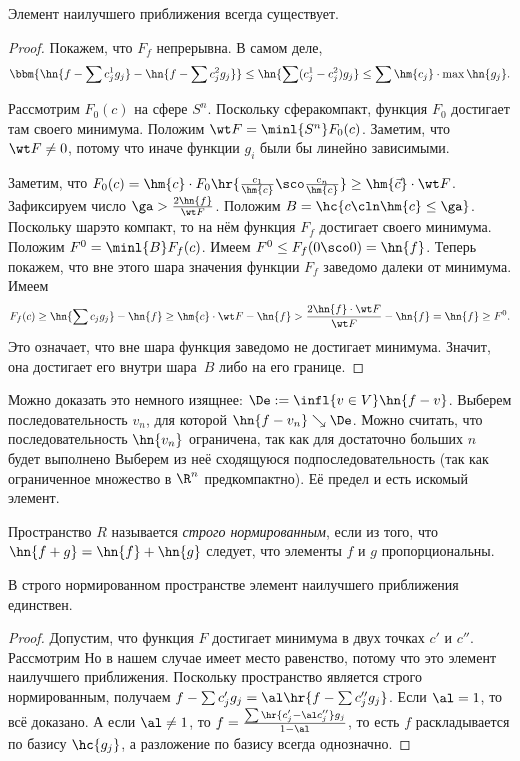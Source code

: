 \documentclass[a4paper]{article}
\begin{document}
\begin{theorem}
Элемент наилучшего приближения всегда существует.
\end{theorem}
\begin{proof}
Покажем, что $F_f$ непрерывна. В самом деле,
$$\bbm{ \hn{f - \sum c_j^1 g_j} - \hn{f - \sum c_j^2 g_j}} \le
\hn{\sum (c_j^1 - c_j^2) g_j} \le \sum \hm{c_j} \cdot \max \hn{g_j}.$$

Рассмотрим $F_0(c)$ на сфере $S^n$. Поскольку сфера\т компакт, функция $F_0$ достигает там своего
минимума. Положим $\wt F = \minl{S^n} F_0(c)$. Заметим, что $\wt F \neq 0$,
потому что иначе функции $g_i$ были бы линейно зависимыми.

Заметим, что $F_0(c) = \hm{c} \cdot F_0\hr{\frac{c_1}{\hm{c}}\sco \frac{c_n}{\hm{c}}} \ge \hm{\vec c} \cdot \wt F$.
Зафиксируем число $\ga > \frac{2 \hn{f}}{\wt F}$. Положим $B = \hc{c\cln \hm{c} \le \ga}$.
Поскольку шар\т это компакт, то на нём функция $F_f$ достигает своего минимума.
Положим $F^0 = \minl{B} F_f(c)$.
Имеем $F^0 \le F_f(0\sco 0) = \hn{f}$.
Теперь покажем, что вне этого шара значения функции $F_f$ заведомо далеки от минимума.
Имеем $$F_f(c) \ge \hn{\sum c_j g_j}- \hn{f} \ge \hm{c} \cdot \wt F - \hn{f} >
\frac{2\hn{f}\cdot \wt F}{\wt F} - \hn{f} = \hn{f} \ge F^0.$$
Это означает, что вне шара функция заведомо не достигает минимума. Значит, она достигает
его внутри шара~$B$ либо на его границе.
\end{proof}

\begin{note}
Можно доказать это немного изящнее: $\De := \infl{v\in V} \hn{f-v}$. Выберем последовательность $v_n$,
для которой $\hn{f - v_n} \searrow \De$. Можно считать, что последовательность $\hn{v_n}$ ограничена, так как
для достаточно больших $n$ будет выполнено
Выберем из неё сходящуюся подпоследовательность (так как ограниченное множество в $\R^n$ предкомпактно). Её предел и есть искомый элемент.
\end{note}

\begin{df}
Пространство $R$ называется \emph{строго нормированным}, если из того, что $\hn{f+g} = \hn{f} + \hn{g}$
следует, что элементы $f$ и $g$ пропорциональны.
\end{df}

\begin{theorem}
В строго нормированном пространстве элемент наилучшего приближения единствен.
\end{theorem}
\begin{proof}
Допустим, что функция $F$ достигает минимума в двух точках $c'$ и $c''$.
Рассмотрим
Но в нашем случае имеет место равенство, потому что это элемент наилучшего приближения.
Поскольку пространство является строго нормированным, получаем $f - \sum c'_j g_j = \al\hr{f - \sum c''_j g_j}$.
Если $\al = 1$, то всё доказано. А если $\al \neq 1$, то $f = \frac{\sum \hr{c'_j - \al c''_j}g_j}{1-\al}$,
то есть $f$ раскладывается по базису $\hc{g_j}$, а разложение по базису всегда однозначно.
\end{proof}
\end{document}
